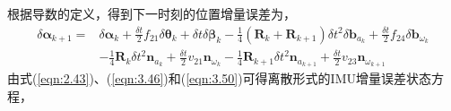 根据导数的定义，得到下一时刻的位置增量误差为，
\begin{equation}
\label{eqn:3.50}
\begin{aligned}
\delta \bm{\alpha}_{k+1} =& \delta \bm{\alpha}_{k}+\frac{\delta t}{2} f_{21} \delta \bm{\theta}_{k}+\delta t \delta \bm{\beta}_{k}-\frac{1}{4}\left( \mathbf{R}_{k}+\mathbf{R}_{k+1}\right) \delta t^{2} \delta \mathbf{b}_{a_{k}}+\frac{\delta t}{2} f_{24} \delta \mathbf{b}_{\omega_{k}} \\
& -\frac{1}{4} \mathbf{R}_{k} \delta t^{2} \mathbf{n}_{a_{k}} +\frac{\delta t}{2} v_{21} \mathbf{n}_{\omega_{k}}-\frac{1}{4} \mathbf{R}_{k+1} \delta t^{2} \mathbf{n}_{a_{k+1}}+\frac{\delta t}{2} v_{23} \mathbf{n}_{\omega_{k+1}}
\end{aligned}
\end{equation}
由式(\ref{eqn:2.43})、(\ref{eqn:3.46})和(\ref{eqn:3.50})可得离散形式的IMU增量误差状态方程，
